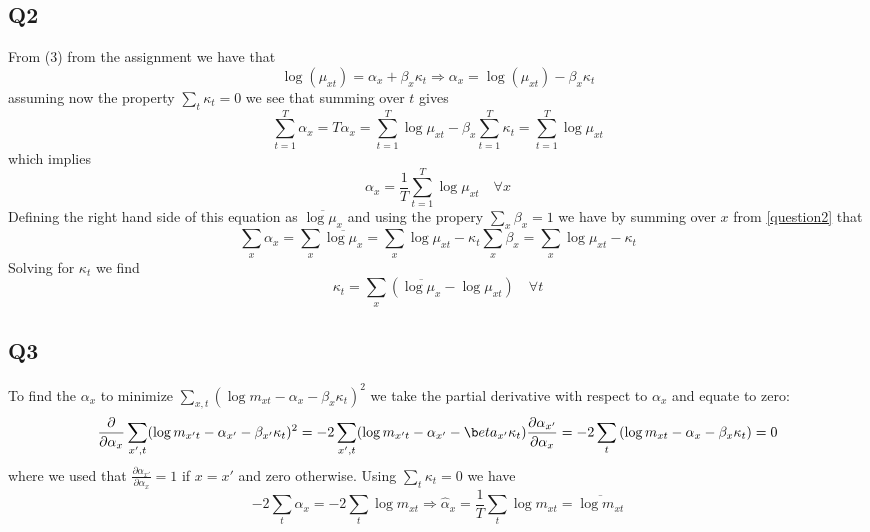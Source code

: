 \documentclass[11pt]{article}
\begin{document}
\subsection*{Q2}

From (3) from the assignment we have that
\begin{equation}
\log(\mu_{xt}) = \alpha_x + \beta_x \kappa_t \Rightarrow \alpha_x = \log(\mu_{xt}) - \beta_x \kappa_t \label{question2}
\end{equation}
assuming now the property $\sum_t \kappa_t = 0$  we see that summing over $t$ gives
\begin{equation}
\sum_{t=1}^T \alpha_x = T \alpha_x = \sum_{t=1}^T \log \mu_{xt} - \beta_x \sum_{t=1}^T \kappa_t = \sum_{t=1}^T \log \mu_{xt} 
\end{equation}
which implies 
\begin{equation}
\alpha_x = \frac{1}{T} \sum_{t=1}^T \log \mu_{xt} \quad \forall x
\end{equation}
Defining the right hand side of this equation as $\overline{ \log \mu_x}$ and using the propery $\sum_x \beta_x = 1$ we have by summing over $x$ from \eqref{question2} that
\begin{equation}
\sum_x \alpha_x = \sum_x \overline{\log \mu_x} = \sum_x \log \mu_{xt} - \kappa_t \sum_x \beta_x
		= \sum_x \log \mu_{xt} - \kappa_t
\end{equation}
Solving for $\kappa_t$ we find
\begin{equation}
\kappa_t = \sum_x ( \overline{\log \mu_x} - \log \mu_{xt}) \quad \forall t
\end{equation}

\subsection*{Q3}

To find the $\alpha_x$ to minimize $\sum_{x,t} (\log m_{xt} - \alpha_x - \beta_x\kappa_t)^2$ we take the partial derivative with respect to $\alpha_x$ and equate to zero:
\begin{equation}
\frac{\partial}{\partial \alpha_x} \sum_{x',t} (\log m_{x't} - \alpha_{x'} - \beta_{x'} \kappa_t)^2
 = -2 \sum_{x',t} (\log m_{x't} - \alpha_{x'} - \b	eta_{x'} \kappa_t) \frac{\partial \alpha_{x'}}{\partial \alpha_{x}} = -2 \sum_t \left ( \log m_{xt} - \alpha_x - \beta_x \kappa_t \right ) = 0
\end{equation}
where we used that $\frac{\partial \alpha_{x'}}{\partial \alpha_{x}} = 1$ if $x = x'$ and zero otherwise. Using $\sum_t \kappa_t = 0$ we have
\begin{equation}
-2 \sum_t \alpha_x = -2 \sum_t \log m_{xt} \Rightarrow \hat{\alpha}_x = \frac{1}{T} \sum_t \log m_{xt} = \overline {\log m_{xt}}
\end{equation}
\end{document}
